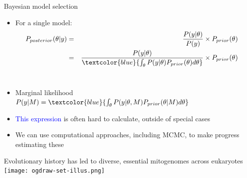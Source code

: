 \documentclass[10pt]{beamer}
\begin{document}
\begin{frame}{Bayesian model selection}
  \begin{itemize}
  \item For a single model:
    \begin{eqnarray*}
      P_{posterior}(\theta|y) & = & \frac{P(y|\theta)}{P(y)} \times P_{prior}(\theta) \\
      & = & \frac{P(y|\theta)}{\textcolor{blue}{\int_{\theta} P(y|\theta) P_{prior}(\theta) d\theta}} \times P_{prior}(\theta)
      \end{eqnarray*} \\
    \item Marginal likelihood $P(y|M) = \textcolor{blue}{\int_{\theta} P(y|\theta, M) P_{prior}(\theta|M) d\theta}$
    \item \textcolor{blue}{This expression} is often hard to calculate, outside of special cases
      \item We can use computational approaches, including MCMC, to make progress estimating these
  \end{itemize}
\end{frame}

\begin{frame}{Evolutionary history has led to diverse, essential mitogenomes across eukaryotes}
  \centering
  \texttt{[image: ogdraw-set-illus.png]} \\
\end{frame}
\end{document}
